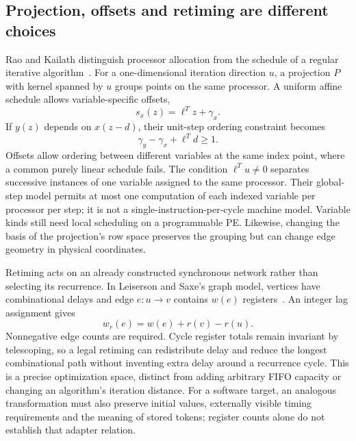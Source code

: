 \documentclass[final,3p,times,authoryear]{elsarticle}
\begin{document}
\subsection{Projection, offsets and retiming are different choices}
Rao and Kailath distinguish processor allocation from the schedule of a regular iterative algorithm~\citep{raokailath1988}. For a one-dimensional iteration direction $u$, a projection $P$ with kernel spanned by $u$ groups points on the same processor. A uniform affine schedule allows variable-specific offsets,
\begin{equation}
 s_x(z)=\ell^Tz+\gamma_x.
\end{equation}
If $y(z)$ depends on $x(z-d)$, their unit-step ordering constraint becomes
\begin{equation}\label{eq:ria-offset}
 \gamma_y-\gamma_x+\ell^Td\ge1.
\end{equation}
Offsets allow ordering between different variables at the same index point, where a common purely linear schedule fails. The condition $\ell^Tu\ne0$ separates successive instances of one variable assigned to the same processor. Their global-step model permits at most one computation of each indexed variable per processor per step; it is not a single-instruction-per-cycle machine model. Variable kinds still need local scheduling on a programmable PE. Likewise, changing the basis of the projection's row space preserves the grouping but can change edge geometry in physical coordinates.

Retiming acts on an already constructed synchronous network rather than selecting its recurrence. In Leiserson and Saxe's graph model, vertices have combinational delays and edge $e:u\to v$ contains $w(e)$ registers~\citep{leiserson1991}. An integer lag assignment gives
\begin{equation}\label{eq:retime}
 w_r(e)=w(e)+r(v)-r(u).
\end{equation}
Nonnegative edge counts are required. Cycle register totals remain invariant by telescoping, so a legal retiming can redistribute delay and reduce the longest combinational path without inventing extra delay around a recurrence cycle. This is a precise optimization space, distinct from adding arbitrary FIFO capacity or changing an algorithm's iteration distance. For a software target, an analogous transformation must also preserve initial values, externally visible timing requirements and the meaning of stored tokens; register counts alone do not establish that adapter relation.
\end{document}
